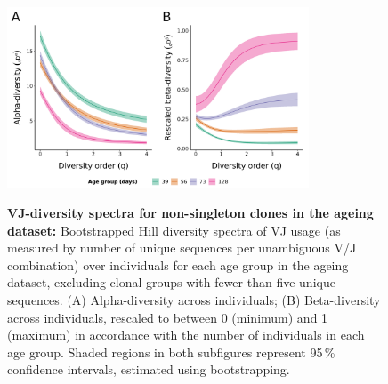 \begin{figure}
\centering
\includegraphics[width = 0.8\textwidth]{_Figures/png/ageing-VJ-diversity-vlarge-alpha-beta}
\begin{subfigure}{0em}
\label{fig:igseq-ageing-VJ-diversity-large-alpha}
\end{subfigure}
\begin{subfigure}{0em}
\label{fig:igseq-ageing-VJ-diversity-large-beta}
\end{subfigure}
\caption[VJ-diversity spectra for large clones in the \igseq ageing dataset]{\textbf{VJ-diversity spectra for non-singleton clones in the \igseq ageing dataset:} Bootstrapped Hill diversity spectra of VJ usage (as measured by number of unique sequences per unambiguous V/J combination) over individuals for each age group in the \igseq ageing dataset, excluding clonal groups with fewer than five unique sequences. (A) Alpha-diversity across individuals; (B) Beta-diversity across individuals, rescaled to between 0 (minimum) and 1 (maximum) in accordance with the number of individuals in each age group. Shaded regions in both subfigures represent 95\,\% confidence intervals, estimated using bootstrapping.}
\label{fig:igseq-ageing-VJ-diversity-large-spectra}
\end{figure}


